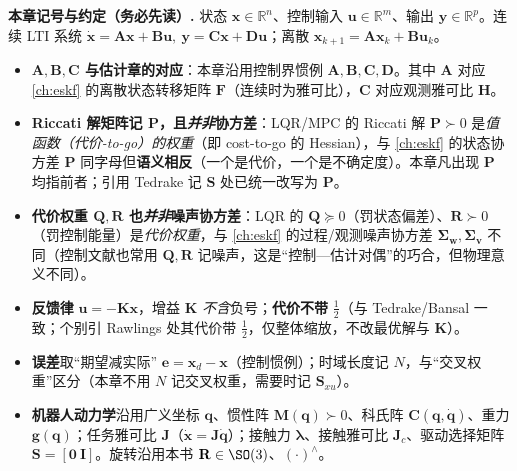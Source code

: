 \begin{note}
\textbf{本章记号与约定（务必先读）.}\;
状态 $\mathbf{x}\in\mathbb{R}^n$、控制输入 $\mathbf{u}\in\mathbb{R}^m$、输出 $\mathbf{y}\in\mathbb{R}^p$。连续 LTI 系统 $\dot{\mathbf{x}}=\mathbf{A}\mathbf{x}+\mathbf{B}\mathbf{u},\ \mathbf{y}=\mathbf{C}\mathbf{x}+\mathbf{D}\mathbf{u}$；离散 $\mathbf{x}_{k+1}=\mathbf{A}\mathbf{x}_k+\mathbf{B}\mathbf{u}_k$。
\begin{itemize}
  \item \textbf{$\mathbf{A},\mathbf{B},\mathbf{C}$ 与估计章的对应}：本章沿用控制界惯例 $\mathbf{A},\mathbf{B},\mathbf{C},\mathbf{D}$。其中 $\mathbf{A}$ 对应 \cref{ch:eskf} 的离散状态转移矩阵 $\mathbf{F}$（连续时为雅可比），$\mathbf{C}$ 对应观测雅可比 $\mathbf{H}$。
  \item \textbf{Riccati 解矩阵记 $\mathbf{P}$，且\emph{并非}协方差}：LQR/MPC 的 Riccati 解 $\mathbf{P}\succ0$ 是\emph{值函数（代价-to-go）的权重}（即 cost-to-go 的 Hessian），与 \cref{ch:eskf} 的状态协方差 $\mathbf{P}$ 同字母但\textbf{语义相反}（一个是代价，一个是不确定度）。本章凡出现 $\mathbf{P}$ 均指前者；引用 Tedrake 记 $\mathbf{S}$ 处已统一改写为 $\mathbf{P}$。
  \item \textbf{代价权重 $\mathbf{Q},\mathbf{R}$ 也\emph{并非}噪声协方差}：LQR 的 $\mathbf{Q}\succeq0$（罚状态偏差）、$\mathbf{R}\succ0$（罚控制能量）是\emph{代价权重}，与 \cref{ch:eskf} 的过程/观测噪声协方差 $\boldsymbol{\Sigma}_{\mathbf{w}},\boldsymbol{\Sigma}_{\mathbf{v}}$ 不同（控制文献也常用 $\mathbf{Q},\mathbf{R}$ 记噪声，这是“控制—估计对偶”的巧合，但物理意义不同）。
  \item \textbf{反馈律} $\mathbf{u}=-\mathbf{K}\mathbf{x}$，增益 $\mathbf{K}$ \emph{不含}负号；\textbf{代价不带} $\tfrac12$（与 Tedrake/Bansal 一致；个别引 Rawlings 处其代价带 $\tfrac12$，仅整体缩放，不改最优解与 $\mathbf{K}$）。
  \item \textbf{误差}取“期望减实际” $\mathbf{e}=\mathbf{x}_d-\mathbf{x}$（控制惯例）；时域长度记 $N$，与“交叉权重”区分（本章不用 $N$ 记交叉权重，需要时记 $\mathbf{S}_{xu}$）。
  \item \textbf{机器人动力学}沿用广义坐标 $\mathbf{q}$、惯性阵 $\mathbf{M}(\mathbf{q})\succ0$、科氏阵 $\mathbf{C}(\mathbf{q},\dot{\mathbf{q}})$、重力 $\mathbf{g}(\mathbf{q})$；任务雅可比 $\mathbf{J}$（$\dot{\mathbf{x}}=\mathbf{J}\dot{\mathbf{q}}$）；接触力 $\boldsymbol{\lambda}$、接触雅可比 $\mathbf{J}_c$、驱动选择矩阵 $\mathbf{S}=[\mathbf{0}\ \mathbf{I}]$。旋转沿用本书 $\mathbf{R}\in\SO(3)$、$(\cdot)^\wedge$。
\end{itemize}
\end{note}

